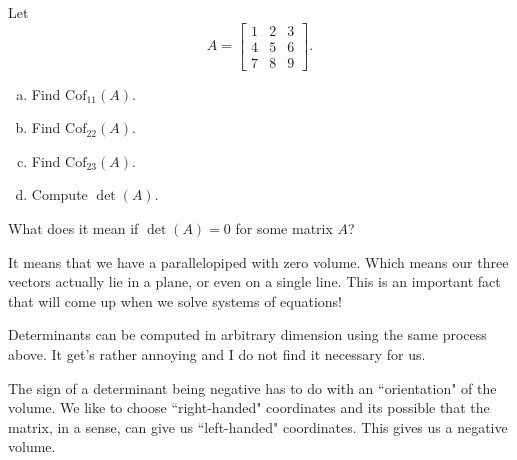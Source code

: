         \begin{exercise} Let
        \[
        A=\begin{bmatrix} 1 & 2 & 3 \\ 4 & 5 & 6 \\ 7 & 8 & 9 \end{bmatrix}.
        \]
        \begin{enumerate}[(a)]
            \item Find $\textrm{Cof}_{11}(A)$.
            \item Find $\textrm{Cof}_{22}(A)$.
            \item Find $\textrm{Cof}_{23}(A)$.
            \item Compute $\det(A)$.
        \end{enumerate}
        
        \end{exercise}
        
        \begin{question}
        What does it mean if $\det(A)=0$ for some matrix $A$?
        \end{question}
        
        \begin{answer}
        It means that we have a parallelopiped with zero volume.  Which means our three vectors actually lie in a plane, or even on a single line.  This is an important fact that will come up when we solve systems of equations!
        \end{answer}
        
        \begin{remark}
        Determinants can be computed in arbitrary dimension using the same process above.  It get's rather annoying and I do not find it necessary for us.
        \end{remark}
        
        \begin{remark}
        The sign of a determinant being negative has to do with an ``orientation" of the volume.  We like to choose ``right-handed" coordinates and its possible that the matrix, in a sense, can give us ``left-handed" coordinates.  This gives us a negative volume.
        \end{remark}
        
